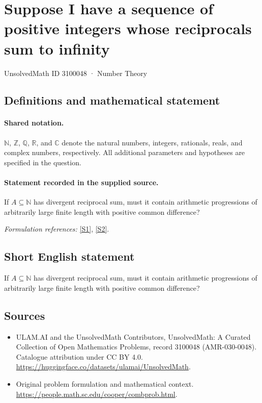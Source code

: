 \documentclass[11pt]{article}
\newcommand{\sref}[2]{\hyperlink{source:#1:#2}{[S#2]}}
\begin{document}
\setcounter{section}{3100047}
\section{Suppose I have a sequence of positive integers whose reciprocals sum to infinity}\label{3100048}
{\small UnsolvedMath ID 3100048 · Number Theory}
\subsection{Definitions and mathematical statement}

\paragraph{Shared notation.}$\mathbb N$, $\mathbb Z$, $\mathbb Q$, $\mathbb R$, and $\mathbb C$ denote the natural numbers, integers, rationals, reals, and complex numbers, respectively. All additional parameters and hypotheses are specified in the question.


\paragraph{Statement recorded in the supplied source.}
If $A\subseteq\mathbb N$ has divergent reciprocal sum, must it contain arithmetic progressions of arbitrarily large finite length with positive common difference?
\par\smallskip\textit{Formulation references:} \sref{3100048}{1}, \sref{3100048}{2}.
\subsection{Short English statement}
If $A\subseteq\mathbb N$ has divergent reciprocal sum, must it contain arithmetic progressions of arbitrarily large finite length with positive common difference?
\subsection{Sources}
\begin{itemize}
\item[\hypertarget{source:3100048:1}{S1}] ULAM.AI and the UnsolvedMath Contributors, UnsolvedMath: A Curated Collection of Open Mathematics Problems, record 3100048 (AMR-030-0048). Catalogue attribution under CC BY 4.0.
\url{https://huggingface.co/datasets/ulamai/UnsolvedMath}.
\item[\hypertarget{source:3100048:2}{S2}] Original problem formulation and mathematical context.
\url{https://people.math.sc.edu/cooper/combprob.html}.
\end{itemize}
\label{end:3100048}
\end{document}
